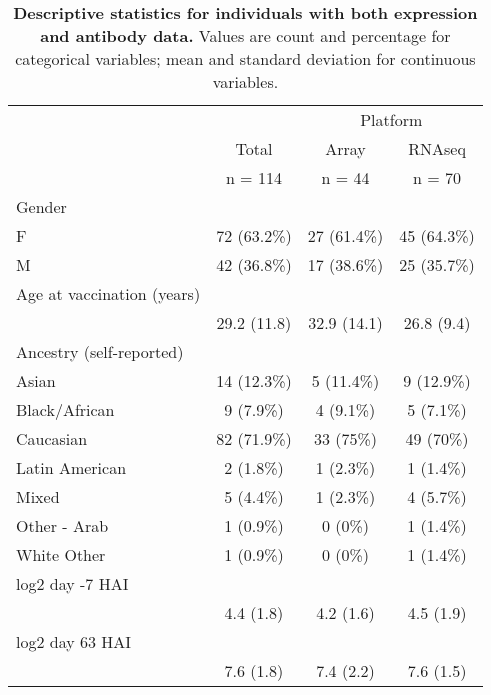 \begin{table}[] 
 \centering 
 \caption{\textbf{Descriptive statistics for individuals with both expression and antibody data.} Values are count and percentage for categorical variables; mean and standard deviation for continuous variables.}\label{tab:hird_table1}
 \begin{tabular}{ l c c c }
 \toprule
  &   &  \multicolumn{ 2 }{c}{ Platform }\\ 
  & Total & Array & \gls{RNAseq} \\ 
  & n = 114 & n = 44 & n = 70 \\ 
  \midrule
 Gender &   &   &  \\ 
 \hspace{6pt}    F & 72 (63.2\%) & 27 (61.4\%) & 45 (64.3\%)\\ 
 \hspace{6pt}    M & 42 (36.8\%) & 17 (38.6\%) & 25 (35.7\%)\\ 
 Age at vaccination (years)  &   &   &  \\ 
 \hspace{6pt}   & 29.2 (11.8) & 32.9 (14.1) & 26.8 (9.4)\\ 
 Ancestry (self-reported) &   &   &  \\ 
 \hspace{6pt}    Asian & 14 (12.3\%) & 5 (11.4\%) & 9 (12.9\%)\\ 
 \hspace{6pt}    Black/African & 9 (7.9\%) & 4 (9.1\%) & 5 (7.1\%)\\ 
 \hspace{6pt}    Caucasian & 82 (71.9\%) & 33 (75\%) & 49 (70\%)\\ 
 \hspace{6pt}    Latin American & 2 (1.8\%) & 1 (2.3\%) & 1 (1.4\%)\\ 
 \hspace{6pt}    Mixed & 5 (4.4\%) & 1 (2.3\%) & 4 (5.7\%)\\ 
 \hspace{6pt}    Other - Arab & 1 (0.9\%) & 0 (0\%) & 1 (1.4\%)\\ 
 \hspace{6pt}    White Other & 1 (0.9\%) & 0 (0\%) & 1 (1.4\%)\\ 
 log2 day -7 HAI  &   &   &  \\ 
 \hspace{6pt}   & 4.4 (1.8) & 4.2 (1.6) & 4.5 (1.9)\\ 
 log2 day 63 HAI  &   &   &  \\ 
 \hspace{6pt}   & 7.6 (1.8) & 7.4 (2.2) & 7.6 (1.5)\\ 

\end{tabular}
\end{table}
